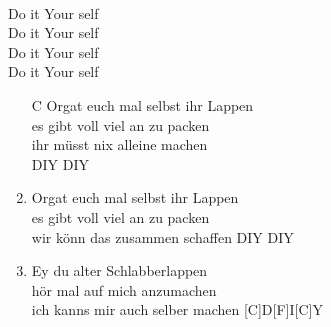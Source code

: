 \def\Titel{Orgat euch Mal selbst ihr Lappen}
\def\Interpret{Die BÄND}
\def\Referenz{Für alle die ständig für andere Organ}

\LiedSetup{}

\begin{guitarMagic}
    \\
            Do it Your self\\
            Do it Your self\\
            Do it Your self\\
            Do it Your self\\

    \begin{enumerate}
        \item[C]Orgat euch mal selbst ihr Lappen\\
            [F]es gibt voll viel an zu packen\\
            [G]ihr müsst nix alleine machen\\
            [C]DIY DIY\\

        \item Orgat euch mal selbst ihr Lappen \\
            es gibt voll viel an zu packen\\
            wir könn das zusammen schaffen DIY DIY\\

        \item Ey du alter Schlabberlappen\\
            hör mal auf mich anzumachen\\
            ich kanns mir auch selber machen
            [C]D\hspace{7pt}[F]I\hspace{7pt}[C]Y \\

    \end{enumerate}
\end{guitarMagic}
